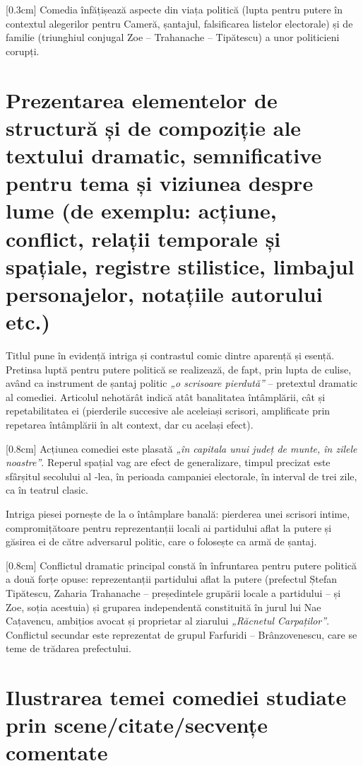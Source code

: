 [0.3cm]
Comedia înfățișează aspecte din viața politică (lupta pentru putere în contextul alegerilor pentru Cameră, șantajul, falsificarea listelor electorale) și de familie (triunghiul conjugal Zoe -- Trahanache -- Tipătescu) a unor politicieni corupți.


\section{Prezentarea elementelor de structură și de compoziție ale textului dramatic, semnificative pentru tema și viziunea despre lume {\footnotesize\normalfont(de exemplu: acțiune, conflict, relații temporale și spațiale, registre stilistice, limbajul personajelor, notațiile autorului etc.)}}

Titlul pune în evidență intriga și contrastul comic dintre aparență și esență. Pretinsa luptă pentru putere politică se realizează, de fapt, prin lupta de culise, având ca instrument de șantaj politic \textit{„o scrisoare pierdută”} -- pretextul dramatic al comediei. Articolul nehotărât indică atât banalitatea întâmplării, cât și repetabilitatea ei (pierderile succesive ale aceleiași scrisori, amplificate prin repetarea întâmplării în alt context, dar cu același efect).

[0.8cm]
Acțiunea comediei este plasată \textit{„în capitala unui județ de munte, în zilele noastre”}. Reperul spațial vag are efect de generalizare, timpul precizat este sfârșitul secolului al -lea, în perioada campaniei electorale, în interval de trei zile, ca în teatrul clasic.

Intriga piesei pornește de la o întâmplare banală: pierderea unei scrisori intime, compromițătoare pentru reprezentanții locali ai partidului aflat la putere și găsirea ei de către adversarul politic, care o folosește ca armă de șantaj.

[0.8cm]
Conflictul dramatic principal constă în înfruntarea pentru putere politică a două forțe opuse: reprezentanții partidului aflat la putere (prefectul Ștefan Tipătescu, Zaharia Trahanache -- președintele grupării locale a partidului -- și Zoe, soția acestuia) și gruparea independentă constituită în jurul lui Nae Cațavencu, ambițios avocat și proprietar al ziarului \textit{„Răcnetul Carpaților”}. Conflictul secundar este reprezentat de grupul Farfuridi -- Brânzovenescu, care se teme de trădarea prefectului.


\section{Ilustrarea temei comediei studiate prin scene/citate/secvențe comentate}

